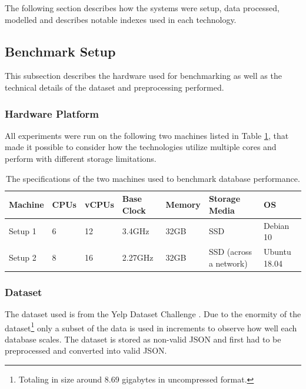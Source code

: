 The following section describes how the systems were setup, data processed, modelled and describes notable indexes used in each technology.

\subsection{Benchmark Setup}

This subsection describes the hardware used for benchmarking as well as the technical details of the dataset and preprocessing performed.

\subsubsection{Hardware Platform}
All experiments were run on the following two machines listed in Table \ref{tab:hardware}, that made it possible to consider how the technologies utilize multiple cores and perform with different storage limitations.

\begin{table}[h]
    \centering
    \caption{The specifications of the two machines used to benchmark database performance.}
    \vspace*{5mm}
    \begin{tabular}{ |p{1.2cm}|p{1.2cm}|p{1.2cm}|p{1.6cm}|p{1.3cm}|p{3.5cm}|p{2cm}|}
        \hline
        \rowcolor{Gray}
        Machine    & CPUs & vCPUs & Base Clock & Memory & Storage Media & OS           \\
        \hline
        Setup 1   & 6    & 12    & 3.4GHz     & 32GB   & SSD                      & Debian 10    \\
        Setup 2   & 8    & 16    & 2.27GHz    & 32GB   & SSD (across a network) & Ubuntu 18.04 \\
        \hline
    \end{tabular}
    \label{tab:hardware}
\end{table}

\subsubsection{Dataset}
The dataset used is from the Yelp Dataset Challenge \cite{yelpdataset}. Due to the enormity of the dataset\footnote{Totaling in size around 8.69 gigabytes in uncompressed format.} only a subset of the data is used in increments to observe how well each database scales. The dataset is stored as non-valid JSON and first had to be preprocessed and converted into valid JSON.

